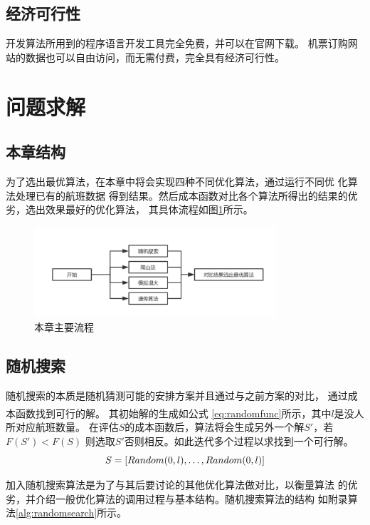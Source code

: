 \documentclass[fontset=fandol,a4paper,zihao=5]{ctexart}
\newcommand{\upcite}[1]{\textsuperscript{\textsuperscript{\cite{#1}}}}
\renewcommand{\eqref}[1]{公式 \ref{#1}}
\begin{document}
		\subsection{经济可行性}
			开发算法所用到的程序语言开发工具完全免费，并可以在官网下载。
            机票订购网站的数据也可以自由访问，而无需付费，完全具有经济可行性。
	\section{问题求解}
	\label{sec:solve}
		\subsection{本章结构}
			为了选出最优算法，在本章中将会实现四种不同优化算法，通过运行不同优
            化算法处理已有的航班数据
            得到结果。然后成本函数对比各个算法所得出的结果的优劣，选出效果最好的优化算法，
            其具体流程如图\ref{fig:flow}所示。
			\begin{figure}[!h]
				\centering
				\includegraphics[width=0.8\textwidth]{pic/flow.pdf}
				\caption{\label{fig:flow}本章主要流程}
			\end{figure}
		\subsection{随机搜索}
		\label{sec:random}
			随机搜索的本质是随机猜测可能的安排方案并且通过与之前方案的对比，
            通过成本函数找到可行的解\upcite{贺红2002随机算法的一般性原理}。
            其初始解的生成如\eqref{eq:randomfunc}所示，其中$l$是没人所对应航班数量。
            在评估$S$的成本函数后，算法将会生成另外一个解$S'$，若$F(S')<F(S)$
            则选取$S'$否则相反。如此迭代多个过程以求找到一个可行解。
            \begin{equation}
                S = [Random(0,l), \dots , Random(0,l)]\\
                \label{eq:randomfunc}
            \end{equation}
			
			加入随机搜索算法是为了与其后要讨论的其他优化算法做对比，以衡量算法
            的优劣，并介绍一般优化算法的调用过程与基本结构。随机搜索算法的结构
            如附录算法\ref{alg:randomsearch}所示。
		
\end{document}
